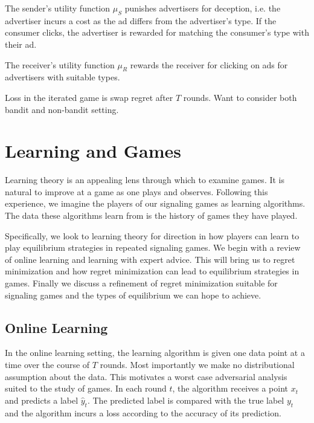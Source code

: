\documentclass{article}
\begin{document}
The sender's utility function $\mu_S$ punishes advertisers for deception, i.e. the advertiser incurs a cost as the ad differs from the advertiser's type. If the consumer clicks, the advertiser is rewarded for matching the consumer's type with their ad. 

The receiver's utility function $\mu_R$ rewards the receiver for clicking on ads for advertisers with suitable types.

Loss in the iterated game is swap regret after $T$ rounds. Want to consider both bandit and non-bandit setting. 


\section{Learning and Games}

Learning theory is an appealing lens through which to examine games. It is natural to improve at a game as one plays and observes. Following this experience, we imagine the players of our signaling games as learning algorithms. The data these algorithms learn from is the history of games they have played. 

Specifically, we look to learning theory for direction in how players can learn to play equilibrium strategies in repeated signaling games. We begin with a review of online learning and learning with expert advice. This will bring us to regret minimization and how regret minimization can lead to equilibrium strategies in games. Finally we discuss a refinement of regret minimization suitable for signaling games and the types of equilibrium we can hope to achieve.

\subsection{Online Learning}

In the online learning setting, the learning algorithm is given one data point at a time over the course of $T$ rounds. Most importantly we make no distributional assumption about the data. This motivates a worst case adversarial analysis suited to the study of games. In each round $t$, the algorithm receives a point $x_t$ and predicts a label $\hat y_t$. The predicted label is compared with the true label $y_t$ and the algorithm incurs a loss according to the accuracy of its prediction.
\end{document}

